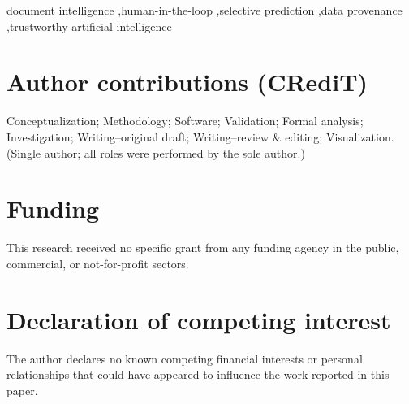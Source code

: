 \documentclass[preprint,12pt,authoryear]{elsarticle}
\begin{document}
\begin{frontmatter}
\begin{keyword}
document intelligence \sep human-in-the-loop \sep selective prediction \sep data provenance \sep trustworthy artificial intelligence
\end{keyword}
\end{frontmatter}

\section*{Author contributions (CRediT)}
Conceptualization; Methodology; Software; Validation; Formal analysis; Investigation; Writing--original draft; Writing--review \& editing; Visualization. (Single author; all roles were performed by the sole author.)

\section*{Funding}
This research received no specific grant from any funding agency in the public, commercial, or not-for-profit sectors.

\section*{Declaration of competing interest}
The author declares no known competing financial interests or personal relationships that could have appeared to influence the work reported in this paper.
\end{document}
